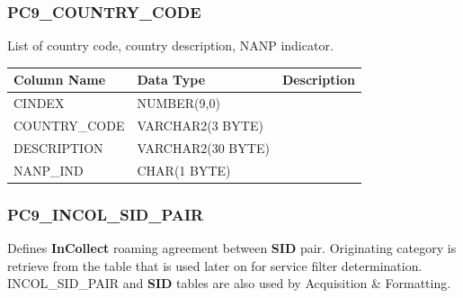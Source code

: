 \documentclass[12pt,twoside]{article}
\begin{document}
\normalsize
\subsubsection{PC9\_COUNTRY\_CODE}
\label{sec-9-14-5}

  List of country code, country description, NANP indicator.

\scriptsize

\begin{center}
\begin{tabular}{lll}
\hline
 \textbf{Column Name}  &  \textbf{Data Type}  &  \textbf{Description}  \\
\hline
 CINDEX                &  NUMBER(9,0)         &                        \\
 COUNTRY\_CODE         &  VARCHAR2(3 BYTE)    &                        \\
 DESCRIPTION           &  VARCHAR2(30 BYTE)   &                        \\
 NANP\_IND             &  CHAR(1 BYTE)        &                        \\
\hline
\end{tabular}
\end{center}


\normalsize
\subsubsection{PC9\_INCOL\_SID\_PAIR}
\label{sec-9-14-6}

   Defines \textbf{InCollect} roaming agreement between \textbf{SID} pair. Originating
   category is retrieve from the table that is used later on for
   service filter determination. INCOL\_SID\_PAIR and \textbf{SID} tables are also
   used by Acquisition \& Formatting.
\scriptsize
\end{document}
